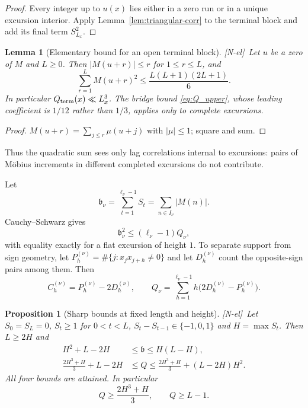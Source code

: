 \documentclass[11pt]{amsart}
\numberwithin{equation}{section}
\theoremstyle{plain}
\newtheorem{proposition}[theorem]{Proposition}
\newtheorem{lemma}[theorem]{Lemma}
\theoremstyle{definition}
\theoremstyle{remark}
\newcommand{\tagNE}{\textup{[N-el]}}
\begin{document}
\begin{proof}
Every integer up to $u(x)$ lies either in a zero run or in a unique excursion
interior. Apply Lemma~\ref{lem:triangular-corr} to the terminal block and
add its final term $S_{L_x}^2$.
\end{proof}

\begin{lemma}[Elementary bound for an open terminal block]
\label{lem:terminal-Q-elementary}
\tagNE\ Let $u$ be a zero of $M$ and $L\ge0$. Then $|M(u+r)|\le r$ for
$1\le r\le L$, and
\begin{equation}
\label{eq:terminal-Q-elementary}
\sum_{r=1}^{L}M(u+r)^2\le\frac{L(L+1)(2L+1)}6 .
\end{equation}
In particular $Q_{\rm term}(x)\ll L_x^3$. The bridge bound
\eqref{eq:Q_upper}, whose leading coefficient is $1/12$ rather than $1/3$,
applies only to complete excursions.
\end{lemma}

\begin{proof}
$M(u+r)=\sum_{j\le r}\mu(u+j)$ with $|\mu|\le1$; square and sum.
\end{proof}


Thus the quadratic sum sees only lag correlations internal to excursions:
pairs of M\"obius increments in different completed excursions do not
contribute.

Let
\begin{equation}
\label{eq:beta_def}
\mathfrak b_\nu=\sum_{t=1}^{\ell_\nu-1}S_t=\sum_{n\in I_\nu}|M(n)|.
\end{equation}
Cauchy--Schwarz gives
\begin{equation}
\label{eq:beta-Q}
\mathfrak b_\nu^2\le(\ell_\nu-1)Q_\nu,
\end{equation}
with equality exactly for a flat excursion of height $1$. To separate
support from sign geometry, let $P_h^{(\nu)}=\#\{j:x_jx_{j+h}\ne0\}$ and let
$D_h^{(\nu)}$ count the opposite-sign pairs among them. Then
\begin{equation}
\label{eq:C-P-D}
C_h^{(\nu)}=P_h^{(\nu)}-2D_h^{(\nu)},\qquad
Q_\nu=\sum_{h=1}^{\ell_\nu-1}h\bigl(2D_h^{(\nu)}-P_h^{(\nu)}\bigr).
\end{equation}

\begin{proposition}[Sharp bounds at fixed length and height]
\label{prop:sharp-LH}
\tagNE\ Let $S_0=S_L=0$, $S_t\ge1$ for $0<t<L$, $S_t-S_{t-1}\in\{-1,0,1\}$ and
$H=\max S_t$. Then $L\ge2H$ and
\begin{align}
H^2+L-2H&\le\mathfrak b\le H(L-H),\label{eq:beta-LH}\\
\frac{2H^3+H}{3}+L-2H&\le Q\le
\frac{2H^3+H}{3}+(L-2H)H^2.\label{eq:Q-LH}
\end{align}
All four bounds are attained. In particular
\begin{equation}
\label{eq:height_Q_min}
Q\ge\frac{2H^3+H}{3},\qquad Q\ge L-1.
\end{equation}
\end{proposition}
\end{document}
